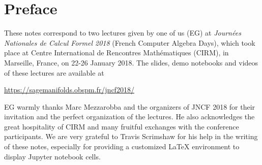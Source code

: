 \section*{Preface}
These notes correspond to two lectures given by one of us (EG)
at \emph{Journées Nationales de Calcul Formel 2018}  (French Computer Algebra Days),
which took place at Centre International de Rencontres Mathématiques (CIRM),
in Marseille, France, on 22-26 January 2018.
The slides, demo
notebooks and videos of these lectures are available at
\begin{center}
\url{https://sagemanifolds.obspm.fr/jncf2018/}
\end{center}

EG warmly thanks Marc Mezzarobba and the organizers of JNCF 2018 for their
invitation and the perfect organization of the lectures. He also acknowledges
the great hospitality of CIRM and many fruitful exchanges with the conference
participants. We are very grateful to Travis Scrimshaw for his help in the
writing of these notes, especially for providing a customized \LaTeX{} environment
to display Jupyter notebook cells.
